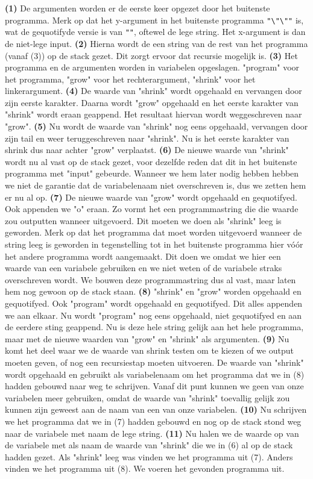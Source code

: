 \textbf{(1)} De argumenten worden er de eerste keer opgezet door het buitenste
programma. Merk op dat het y-argument in het buitenste programma
\texttt{"\textbackslash"\textbackslash""} is, wat de gequotifyde versie is van
\texttt{""}, oftewel de lege string. Het x-argument is dan de niet-lege input.
\textbf{(2)} Hierna wordt de een string van de rest van het programma (vanaf
(3)) op de stack gezet. Dit zorgt ervoor dat recursie mogelijk is.
\textbf{(3)} Het programma en de argumenten worden in variabelen opgeslagen.
"program" voor het programma, "grow" voor het rechterargument, "shrink" voor
het linkerargument.  \textbf{(4)} De waarde van "shrink" wordt opgehaald en
vervangen door zijn eerste karakter. Daarna wordt "grow" opgehaald en het
eerste karakter van "shrink" wordt eraan geappend. Het resultaat hiervan wordt
weggeschreven naar "grow".  \textbf{(5)} Nu wordt de waarde van "shrink" nog
eens opgehaald, vervangen door zijn tail en weer teruggeschreven naar "shrink".
Nu is het eerste karakter van shrink dus naar achter "grow" verplaatst.
\textbf{(6)} De nieuwe waarde van "shrink" wordt nu al vast op de stack gezet,
voor dezelfde reden dat dit in het buitenste programma met "input" gebeurde.
Wanneer we hem later nodig hebben hebben we niet de garantie dat de
variabelenaam niet overschreven is, dus we zetten hem er nu al op.
\textbf{(7)} De nieuwe waarde van "grow" wordt opgehaald en gequotifyed. Ook
appenden we "o" eraan. Zo vormt het een programmastring die die waarde zou
outputten wanneer uitgevoerd. Dit moeten we doen als "shrink" leeg is geworden.
Merk op dat het programma dat moet worden uitgevoerd wanneer de string leeg is
geworden in tegenstelling tot in het buitenste programma hier v\'{o}\'{o}r het
andere programma wordt aangemaakt. Dit doen we omdat we hier een waarde van een
variabele gebruiken en we niet weten of de variabele straks overschreven wordt.
We bouwen deze programmastring dus al vast, maar laten hem nog gewoon op de
stack staan.  \textbf{(8)} "shrink" en "grow" worden opgehaald en gequotifyed.
Ook "program" wordt opgehaald en gequotifyed. Dit alles appenden we aan elkaar.
Nu wordt "program" nog eens opgehaald, niet gequotifyed en aan de eerdere sting
geappend. Nu is deze hele string gelijk aan het hele programma, maar met de
nieuwe waarden van "grow" en "shrink" als argumenten.  \textbf{(9)} Nu komt het
deel waar we de waarde van shrink testen om te kiezen of we output moeten
geven, of nog een recursiestap moeten uitvoeren. De waarde van "shrink" wordt
opgehaald en gebruikt als variabelenaam om het programma dat we in (8) hadden
gebouwd naar weg te schrijven. Vanaf dit punt kunnen we geen van onze
variabelen meer gebruiken, omdat de waarde van "shrink" toevallig gelijk zou
kunnen zijn geweest aan de naam van een van onze variabelen.  \textbf{(10)} Nu
schrijven we het programma dat we in (7) hadden gebouwd en nog op de stack
stond weg naar de variabele met naam de lege string.  \textbf{(11)} Nu halen we
de waarde op van de variabele met als naam de waarde van "shrink" die we in (6)
al op de stack hadden gezet. Als "shrink" leeg was vinden we het programma uit
(7). Anders vinden we het programma uit (8). We voeren het gevonden programma
uit.
